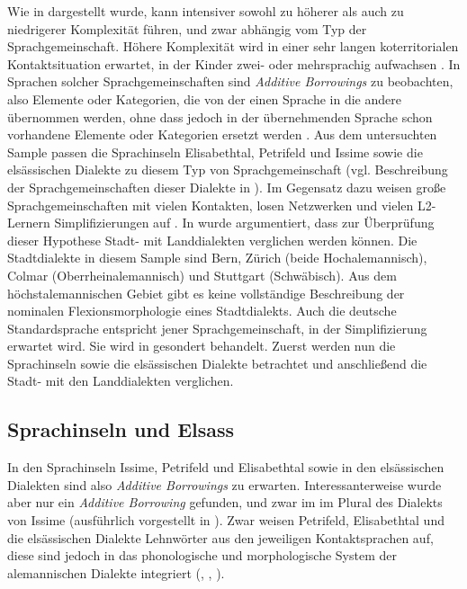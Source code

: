 Wie in  dargestellt wurde, kann intensiver  sowohl zu höherer als auch zu niedrigerer Komplexität führen, und zwar abhängig vom Typ der Sprachgemeinschaft. Höhere Komplexität wird in einer sehr langen koterritorialen Kontaktsituation erwartet, in der Kinder zwei- oder mehrsprachig aufwachsen \citep[34]{Trudgill2011}. In Sprachen solcher Sprachgemeinschaften sind \textit{Additive Borrowings} zu beobachten, also Elemente oder Kategorien, die von der einen Sprache in die andere übernommen werden, ohne dass jedoch in der übernehmenden Sprache schon vorhandene Elemente oder Kategorien ersetzt werden \citep[27]{Trudgill2011}. Aus dem untersuchten Sample passen die Sprachinseln Elisabethtal, Petrifeld und Issime sowie die elsässischen Dialekte zu diesem Typ von Sprachgemeinschaft (vgl. Beschreibung der Sprachgemeinschaften dieser Dialekte in ). Im Gegensatz dazu weisen große Sprachgemeinschaften mit vielen Kontakten, losen Netzwerken und vielen L2-Ler\-nern Simplifizierungen auf \citep[146–147]{Trudgill2011}. In  wurde argumentiert, dass zur Überprüfung dieser Hypothese Stadt- mit Landdialekten verglichen werden können. Die Stadtdialekte in diesem Sample sind Bern, Zürich (beide Hochalemannisch), Colmar (Oberrheinalemannisch) und Stuttgart (Schwäbisch). Aus dem höchstalemannischen Gebiet gibt es keine vollständige Beschreibung der nominalen Flexionsmorphologie eines Stadtdialekts. Auch die deutsche Standardsprache entspricht jener Sprachgemeinschaft, in der Simplifizierung erwartet wird. Sie wird in  gesondert behandelt. Zuerst werden nun die Sprachinseln sowie die elsässischen Dialekte betrachtet und anschließend die Stadt- mit den Landdialekten verglichen.

\subsection{Sprachinseln und Elsass}\label{6.3.1}

In den Sprachinseln Issime, Petrifeld und Elisabethtal sowie in den elsässischen Dialekten sind also \textit{Additive Borrowings} zu erwarten. Interessanterweise wurde aber nur ein \textit{Additive Borrowing} gefunden, und zwar im  im Plural des Dialekts von Issime (ausführlich vorgestellt in ). Zwar weisen Petrifeld, Elisabethtal und die elsässischen Dialekte Lehnwörter aus den jeweiligen Kontaktsprachen auf, diese sind jedoch in das phonologische und morphologische System der alemannischen Dialekte integriert (\citealt[54]{Beyer1963}, \citealt[102–103]{Moser1937}, \citealt[52]{Žirmunskij1928/29}).

